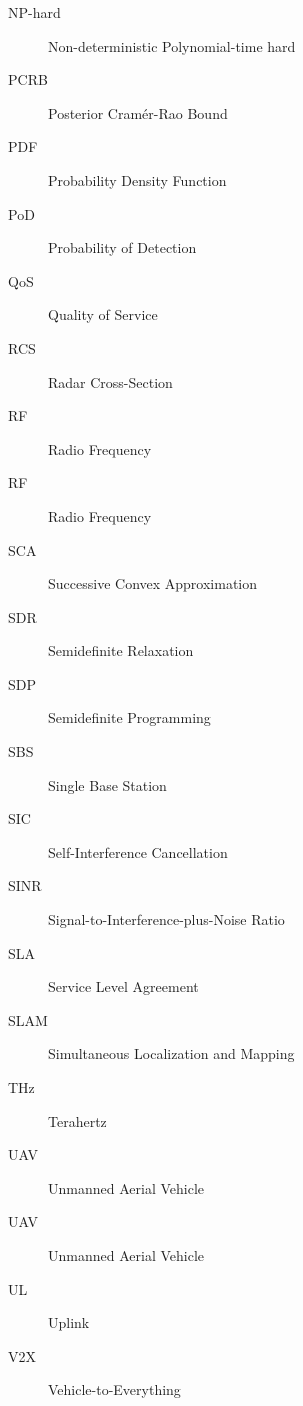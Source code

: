 \begin{description}
\item[NP-hard] Non-deterministic Polynomial-time hard
\item[PCRB] Posterior Cramér-Rao Bound
\item[PDF] Probability Density Function
\item[PoD] Probability of Detection
\item[QoS] Quality of Service
\item[RCS] Radar Cross-Section
\item[RF] Radio Frequency
\item[RF] Radio Frequency
\item[SCA] Successive Convex Approximation
\item[SDR] Semidefinite Relaxation
\item[SDP] Semidefinite Programming
\item[SBS] Single Base Station
\item[SIC] Self-Interference Cancellation
\item[SINR] Signal-to-Interference-plus-Noise Ratio
\item[SLA] Service Level Agreement
\item[SLAM] Simultaneous Localization and Mapping
\item[THz] Terahertz
\item[UAV] Unmanned Aerial Vehicle
\item[UAV] Unmanned Aerial Vehicle
\item[UL] Uplink
\item[V2X] Vehicle-to-Everything
\end{description}
